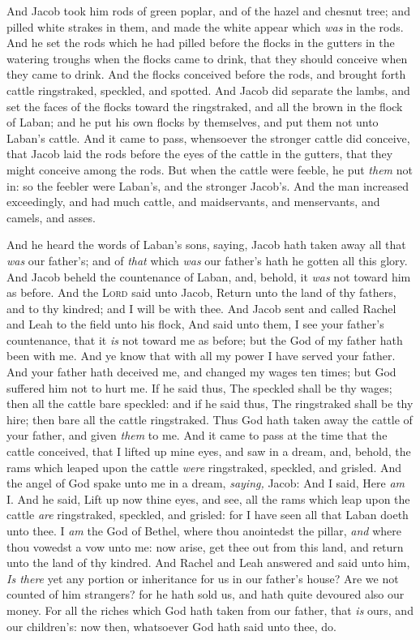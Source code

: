 \documentclass[11pt,letterpaper,oneside]{memoir}
\begin{document}
And Jacob took him rods of green poplar, and of the hazel and chesnut
tree; and pilled white strakes in them, and made the white appear which
\emph{was} in the rods. And he set the rods which he had pilled before
the flocks in the gutters in the watering troughs when the flocks came
to drink, that they should conceive when they came to drink. And the
flocks conceived before the rods, and brought forth cattle ringstraked,
speckled, and spotted. And Jacob did separate the lambs, and set the
faces of the flocks toward the ringstraked, and all the brown in the
flock of Laban; and he put his own flocks by themselves, and put them
not unto Laban's cattle. And it came to pass, whensoever the stronger
cattle did conceive, that Jacob laid the rods before the eyes of the
cattle in the gutters, that they might conceive among the rods. But when
the cattle were feeble, he put \emph{them} not in: so the feebler were
Laban's, and the stronger Jacob's. And the man increased exceedingly,
and had much cattle, and maidservants, and menservants, and camels, and
asses.

And he heard the words of Laban's sons, saying, Jacob hath taken away
all that \emph{was} our father's; and of \emph{that} which \emph{was}
our father's hath he gotten all this glory. And Jacob beheld the
countenance of Laban, and, behold, it \emph{was} not toward him as
before. And the \textsc{Lord} said unto Jacob, Return unto the land of thy
fathers, and to thy kindred; and I will be with thee. And Jacob sent and
called Rachel and Leah to the field unto his flock, And said unto them,
I see your father's countenance, that it \emph{is} not toward me as
before; but the God of my father hath been with me. And ye know that
with all my power I have served your father. And your father hath
deceived me, and changed my wages ten times; but God suffered him not to
hurt me. If he said thus, The speckled shall be thy wages; then all the
cattle bare speckled: and if he said thus, The ringstraked shall be thy
hire; then bare all the cattle ringstraked. Thus God hath taken away the
cattle of your father, and given \emph{them} to me. And it came to pass
at the time that the cattle conceived, that I lifted up mine eyes, and
saw in a dream, and, behold, the rams which leaped upon the cattle
\emph{were} ringstraked, speckled, and grisled. And the angel of God
spake unto me in a dream, \emph{saying,} Jacob: And I said, Here
\emph{am} I. And he said, Lift up now thine eyes, and see, all the rams
which leap upon the cattle \emph{are} ringstraked, speckled, and
grisled: for I have seen all that Laban doeth unto thee. I \emph{am} the
God of Bethel, where thou anointedst the pillar, \emph{and} where thou
vowedst a vow unto me: now arise, get thee out from this land, and
return unto the land of thy kindred. And Rachel and Leah answered and
said unto him, \emph{Is there} yet any portion or inheritance for us in our
father's house? Are we not counted of him strangers? for he hath sold
us, and hath quite devoured also our money. For all the riches which God
hath taken from our father, that \emph{is} ours, and our children's: now
then, whatsoever God hath said unto thee, do.
\end{document}
